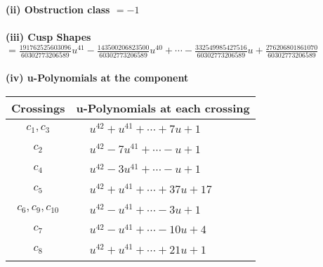 \documentclass[1p]{elsarticle_modified}
\theoremstyle{definition}
\begin{document}
\flushleft \textbf{(ii) Obstruction class $= -1$}\\~\\
\flushleft \textbf{(iii) Cusp Shapes $= \frac{191762525603096}{60302773206589} u^{41}-\frac{143500206823500}{60302773206589} u^{40}+\cdots-\frac{332549985427516}{60302773206589} u+\frac{276206801861070}{60302773206589}$}\\~\\
\newpage\renewcommand{\arraystretch}{1}
\flushleft \textbf{(iv) u-Polynomials at the component}\newline \\
\begin{tabular}{m{50pt}|m{274pt}}
Crossings & \hspace{64pt}u-Polynomials at each crossing \\
\hline $$\begin{aligned}c_{1},c_{3}\end{aligned}$$&$\begin{aligned}
&u^{42}+u^{41}+\cdots+7 u+1
\end{aligned}$\\
\hline $$\begin{aligned}c_{2}\end{aligned}$$&$\begin{aligned}
&u^{42}-7 u^{41}+\cdots- u+1
\end{aligned}$\\
\hline $$\begin{aligned}c_{4}\end{aligned}$$&$\begin{aligned}
&u^{42}-3 u^{41}+\cdots- u+1
\end{aligned}$\\
\hline $$\begin{aligned}c_{5}\end{aligned}$$&$\begin{aligned}
&u^{42}+u^{41}+\cdots+37 u+17
\end{aligned}$\\
\hline $$\begin{aligned}c_{6},c_{9},c_{10}\end{aligned}$$&$\begin{aligned}
&u^{42}- u^{41}+\cdots-3 u+1
\end{aligned}$\\
\hline $$\begin{aligned}c_{7}\end{aligned}$$&$\begin{aligned}
&u^{42}- u^{41}+\cdots-10 u+4
\end{aligned}$\\
\hline $$\begin{aligned}c_{8}\end{aligned}$$&$\begin{aligned}
&u^{42}+u^{41}+\cdots+21 u+1
\end{aligned}$\\
\hline
\end{tabular}\\~\\
\end{document}
